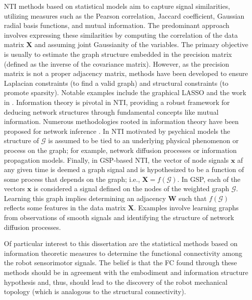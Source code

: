 NTI methods based on statistical models aim to capture signal similarities, utilizing measures such as the Pearson correlation, Jaccard coefficient, Gaussian radial basis functions, and mutual information. The predominant approach involves expressing these similarities by computing the correlation of the data matrix $\bm{X}$ and assuming joint Gaussianity of the variables. The primary objective is usually to estimate the graph structure embedded in the precision matrix (defined as the inverse of the covariance matrix). However, as the precision matrix is not a proper adjacency matrix, methods have been developed to ensure Laplacian constraints (to find a valid graph) and structural constraints (to promote sparsity). Notable examples include the graphical LASSO \cite{Mazumder2011GraphicalLassoNew} and the work in \cite{Olsson2006unknownsensorsactuators,Egilmez2021GraphLaplacianLearning}. Information theory is pivotal in NTI, providing a robust framework for deducing network structures through fundamental concepts like mutual information. Numerous methodologies rooted in information theory have been proposed for network inference \cite{Lungarella2006Mappinginformationflow,Villaverde2014MIDERnetworkinference,Ursino2020TransferEntropyas,Novelli2020Inferringnetworkproperties}. In NTI motivated by psychical models the structure of $\mathcal{G}$ is assumed to be tied to an underlying physical phenomenon or process on the graph; for example, network diffusion processes or information propagation models. Finally, in GSP-based NTI, the vector of node signals $\bm{x}$ af any given time is deemed a graph signal and is hypothesized to be a function of some process that depends on the graph; i.e., $\bm{X} = f(\mathcal{G})$. In GSP, each of the vectors $\bm{x}$ is considered a signal defined on the nodes of the weighted graph $\mathcal{G}$. Learning this graph implies determining an adjacency $\bm{W}$ such that $f(\mathcal{G})$ reflects some features in the data matrix $\bm{X}$. Examples involve learning graphs from observations of smooth signals and identifying the structure of network diffusion processes.

Of particular interest to this dissertation are the statistical methods based on information theoretic measures to determine the functional connectivity among the robot sensorimotor signals. The belief is that the FC found through these methods should be in agreement with the embodiment and information structure hypothesis and, thus, should lead to the discovery of the robot mechanical topology (which is analogous to the structural connectivity).


